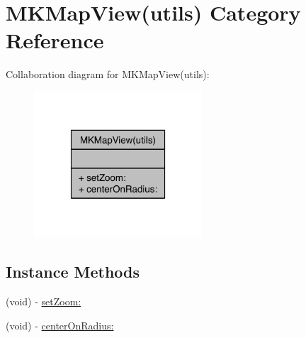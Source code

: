\hypertarget{category_m_k_map_view_07utils_08}{\section{M\-K\-Map\-View(utils) Category Reference}
\label{category_m_k_map_view_07utils_08}
}


Collaboration diagram for M\-K\-Map\-View(utils)\-:
\nopagebreak
\begin{figure}[H]
\begin{center}
\leavevmode
\includegraphics[width=178pt]{category_m_k_map_view_07utils_08__coll__graph}
\end{center}
\end{figure}
\subsection*{Instance Methods}
\begin{DoxyCompactItemize}
\item 
(void) -\/ \hyperlink{category_m_k_map_view_07utils_08_a91a571c0c7deea1a056ebd3f23ae645f}{set\-Zoom\-:}
\item 
(void) -\/ \hyperlink{category_m_k_map_view_07utils_08_a8010f81b8c10adc15f9eb5491154c52c}{center\-On\-Radius\-:}
\end{DoxyCompactItemize}


